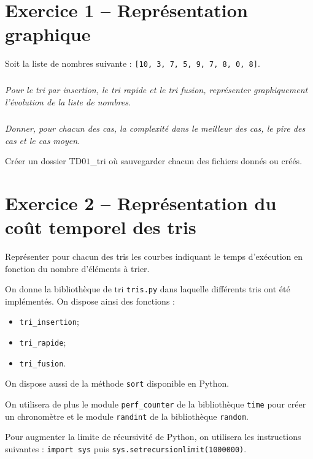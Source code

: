 \documentclass[10pt,fleqn]{article} %
\begin{document}

\vspace{8cm}
\pagestyle{fancy}
\thispagestyle{plain}


\def\columnseprulecolor{\color{ocre}}
\setlength{\columnseprule}{0.4pt} 
\begin{multicols}{2}

\section*{Exercice 1 -- Représentation graphique}
Soit la liste de nombres suivante : \texttt{[10, 3, 7, 5, 9, 7, 8, 0, 8]}.

\subparagraph{}
\textit{Pour le tri par insertion, le tri rapide et le tri fusion, représenter graphiquement l'évolution de la liste de nombres.}

\subparagraph{}
\textit{Donner, pour chacun des cas, la complexité dans le meilleur des cas, le pire des cas et le cas moyen.}

\vspace{1cm}
Créer un dossier TD$01$\_tri où sauvegarder chacun des fichiers donnés ou créés.

\section*{Exercice 2 -- Représentation du coût temporel des tris}

\begin{obj}
Représenter pour chacun des tris les courbes indiquant le temps d'exécution en fonction du nombre d'éléments à trier.
\end{obj}
On donne la bibliothèque de tri \texttt{tris.py} dans laquelle différents tris ont été implémentés.
On dispose ainsi des fonctions : 
\begin{itemize}
\item \texttt{tri\_insertion};
\item \texttt{tri\_rapide};
\item \texttt{tri\_fusion}.
\end{itemize}
On dispose aussi de la méthode \texttt{sort} disponible en Python.

On utilisera de plus le module \texttt{perf\_counter} de la bibliothèque \texttt{time} pour créer un chronomètre et le module \texttt{randint} de la bibliothèque \texttt{random}.

Pour augmenter la limite de récursivité de Python, on utilisera les instructions suivantes : \texttt{import sys} puis \texttt{sys.setrecursionlimit(1000000)}.


\end{multicols}
\end{document}
